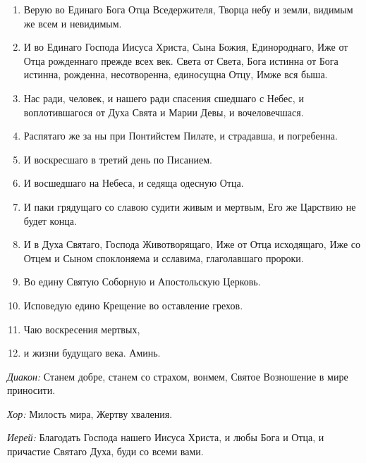 \begin{mymulticols}
\begin{enumerate}

\item Верую во Единаго Бога Отца Вседержителя, Творца небу и земли, видимым же всем и невидимым. 

\item И во Единаго Господа Иисуса Христа, Сына Божия, Единороднаго, Иже от Отца рожденнаго прежде всех век. Света от Света, Бога истинна от Бога истинна, рожденна, несотворенна, единосущна Отцу, Имже вся быша.

\item Нас ради, человек, и нашего ради спасения сшедшаго с Небес, и воплотившагося от Духа Свята и Марии Девы, и вочеловечшася.

\item Распятаго же за ны при Понтийстем Пилате, и страдавша, и погребенна.

\item И воскресшаго в третий день по Писанием.

\item И восшедшаго на Небеса, и седяща одесную Отца.

\item И паки грядущаго со славою судити живым и мертвым, Его же Царствию не будет конца.

\item И в Духа Святаго, Господа Животворящаго, Иже от Отца исходящаго, Иже со Отцем и Сыном споклоняема и сславима, глаголавшаго пророки.

\item Во едину Святую Соборную и Апостольскую Церковь.

\item Исповедую едино Крещение во оставление грехов.

\item Чаю воскресения мертвых,

\item и жизни будущаго века. Аминь. 

\end{enumerate}


{\itshape Диакон:} Станем добре, станем со страхом, вонмем, Святое Возношение в мире приносити.

{\itshape Хор:} Милость мира, Жертву хваления. 

{\itshape Иерей:} Благодать Господа нашего Иисуса Христа, и любы Бога и Отца, и причастие Святаго Духа, буди со всеми вами.


\end{mymulticols}
